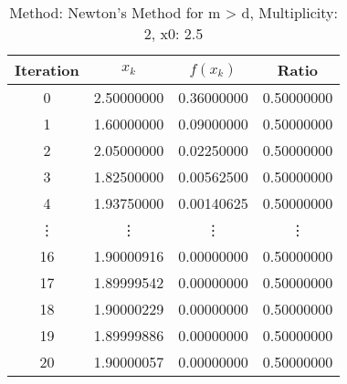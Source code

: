 \begin{table}
\centering
\caption{Method: Newton's Method for m > d, Multiplicity: 2, x0: 2.5}
\label{tab:table_Newton's_Method_for_m_>_d_2_2_5}
\begin{tabular}{c c c c}
\toprule
Iteration &      $x_k$ &   $f(x_k)$ &      Ratio \\
\midrule
        0 & 2.50000000 & 0.36000000 & 0.50000000 \\
        1 & 1.60000000 & 0.09000000 & 0.50000000 \\
        2 & 2.05000000 & 0.02250000 & 0.50000000 \\
        3 & 1.82500000 & 0.00562500 & 0.50000000 \\
        4 & 1.93750000 & 0.00140625 & 0.50000000 \\
   \vdots &     \vdots &     \vdots &     \vdots \\
       16 & 1.90000916 & 0.00000000 & 0.50000000 \\
       17 & 1.89999542 & 0.00000000 & 0.50000000 \\
       18 & 1.90000229 & 0.00000000 & 0.50000000 \\
       19 & 1.89999886 & 0.00000000 & 0.50000000 \\
       20 & 1.90000057 & 0.00000000 & 0.50000000 \\
\bottomrule
\end{tabular}
\end{table}
